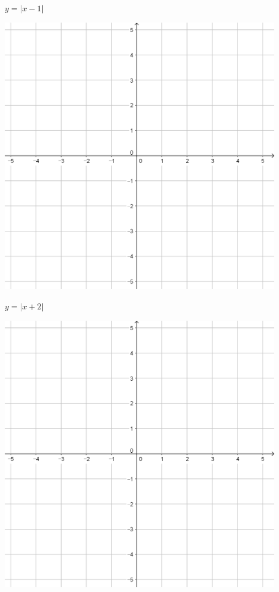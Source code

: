 \documentclass[a4paper]{oblivoir}
\begin{document}
\clearpage
\begin{minipage}{0.45\textwidth}\centering
\(y=|x-1|\)
\par\bigskip\includegraphics[width=0.9\textwidth]{55}
\end{minipage}
\begin{minipage}{0.45\textwidth}\centering
\(y=|x+2|\)
\par\bigskip\includegraphics[width=0.9\textwidth]{55}
\end{minipage}\bigskip\bigskip\par
\end{document}
